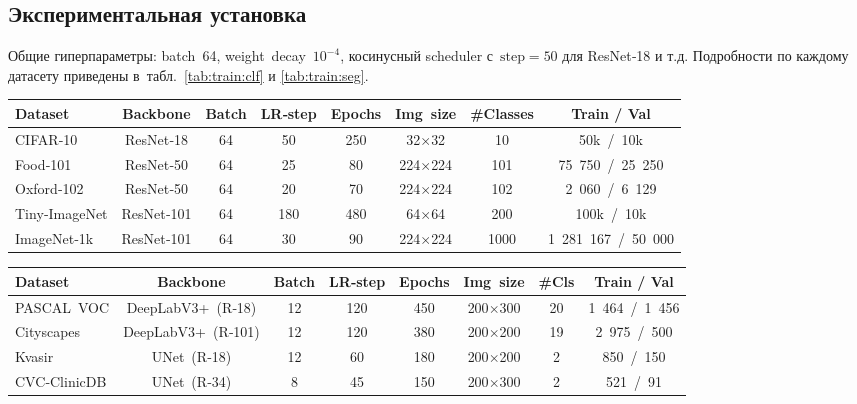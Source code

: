 \subsection{Экспериментальная установка}
\label{sec:tips:expsetup}
Общие гиперпараметры: batch \num{64}, weight decay $10^{-4}$,
косинусный scheduler с $\text{step}=\num{50}$ для ResNet‑18 и т.д.
Подробности по каждому датасету приведены в табл.~\ref{tab:train:clf}
и \ref{tab:train:seg}.

\begin{table*}[htb]
  \centering\small
  \caption{Детали обучения классификаторов.}\label{tab:train:clf}
  \begin{tabular}{lccccccc}
    \toprule
    Dataset & Backbone & Batch & LR‑step & Epochs & Img size & \#Classes & Train / Val\\
    \midrule
    CIFAR‑10     & ResNet‑18  & 64 & 50  & 250 & 32$\times$32 & 10   & 50k / 10k\\
    Food‑101     & ResNet‑50  & 64 & 25  &  80 & 224$\times$224 & 101  & 75 750 / 25 250\\
    Oxford‑102   & ResNet‑50  & 64 & 20  &  70 & 224$\times$224 & 102  &  2 060 / 6 129\\
    Tiny‑ImageNet& ResNet‑101 & 64 & 180 & 480 & 64$\times$64  & 200  & 100k / 10k\\
    ImageNet‑1k  & ResNet‑101 & 64 & 30  &  90 & 224$\times$224 & 1000 & 1 281 167 / 50 000\\
    \bottomrule
  \end{tabular}
\end{table*}

\begin{table*}[htb]
  \centering\small
  \caption{Детали обучения для семантической сегментации.}\label{tab:train:seg}
  \begin{tabular}{lccccccc}
    \toprule
    Dataset & Backbone & Batch & LR‑step & Epochs & Img size & \#Cls & Train / Val\\
    \midrule
    PASCAL VOC  & DeepLabV3+ (R‑18) & 12 & 120 & 450 & 200$\times$300 & 20 & 1 464 / 1 456\\
    Cityscapes   & DeepLabV3+ (R‑101)& 12 & 120 & 380 & 200$\times$200 & 19 & 2 975 / 500\\
    Kvasir       & UNet (R‑18)       & 12 &  60 & 180 & 200$\times$200 & 2  &   850 / 150\\
    CVC‑ClinicDB & UNet (R‑34)       &  8 &  45 & 150 & 200$\times$300 & 2  &   521 / 91\\
    \bottomrule
  \end{tabular}
\end{table*}

